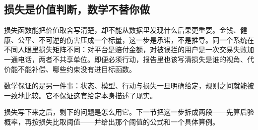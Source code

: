 \subsection{损失是价值判断，数学不替你做}

损失函数能把价值取舍写清楚，却不能从数据里发现什么后果更重要。金钱、健康、公平、不可逆的伤害压成一个标量，这一步是承诺，不是推导。同一个系统在不同人眼里损失矩阵不同：对平台是赔付金额，对被误拦的用户是一次交易失败加一通电话，两者不共享单位。即便必须行动，报告里也该写清损失是谁的视角、代价能不能补偿、哪些约束没有进目标函数。

数学保证的是另一件事：状态、模型、行动与损失一旦明确给定，规则之间就能被一致地比较。它不保证这套给定本身描述了现实。

损失写下来之后，剩下的问题是怎么用它。下一节把这一步拆成两段——先算后验概率，再按损失比取阈值——并给出那个阈值的公式和一个具体算例。
